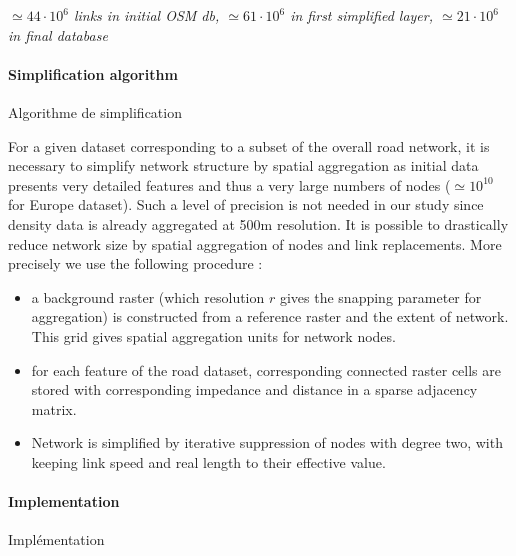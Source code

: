    \textit{$\simeq 44\cdot 10^6$ links in initial OSM db, $\simeq 61\cdot 10^6$ in first simplified layer, $\simeq 21\cdot 10^6$ in final database}






\paragraph{Simplification algorithm}{Algorithme de simplification}

For a given dataset corresponding to a subset of the overall road network, it is necessary to simplify network structure by spatial aggregation as initial data presents very detailed features and thus a very large numbers of nodes ($\simeq 10^10$ for Europe dataset). 
 Such a level of precision is not needed in our study since density data is already aggregated at 500m resolution. It is possible to drastically reduce network size by spatial aggregation of nodes and link replacements. More precisely we use the following procedure :
\begin{itemize}
\item a background raster (which resolution $r$ gives the snapping parameter for aggregation) is constructed from a reference raster and the extent of network. This grid gives spatial aggregation units for network nodes.
\item for each feature of the road dataset, corresponding connected raster cells are stored with corresponding impedance and distance in a sparse adjacency matrix.
\item Network is simplified by iterative suppression of nodes with degree two, with keeping link speed and real length to their effective value.
\end{itemize}




\paragraph{Implementation}{Implémentation}

